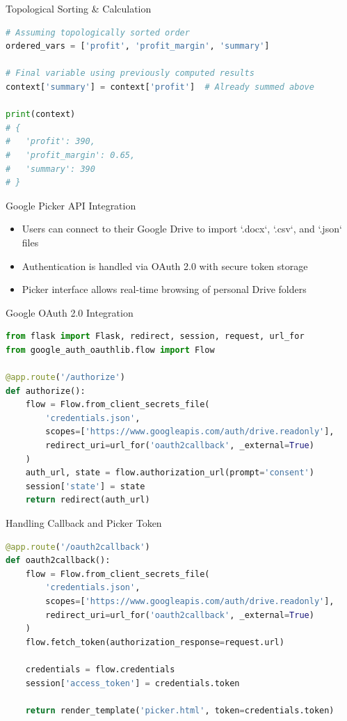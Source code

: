 \documentclass[handout, 12pt]{beamer}
\begin{document}
	\begin{frame}[fragile]{Topological Sorting \& Calculation}
		\begin{lstlisting}[language=Python, breaklines=true, basicstyle=\fontsize{6.5pt}{7.8pt}\selectfont]
# Assuming topologically sorted order
ordered_vars = ['profit', 'profit_margin', 'summary']

# Final variable using previously computed results
context['summary'] = context['profit']  # Already summed above

print(context)
# {
#   'profit': 390,
#   'profit_margin': 0.65,
#   'summary': 390
# }
\end{lstlisting}
	\end{frame}
		
	\begin{frame}{Google Picker API Integration}
		\begin{itemize}
		  \item Users can connect to their Google Drive to import `.docx`, `.csv`, and `.json` files
		  \item Authentication is handled via OAuth 2.0 with secure token storage
		  \item Picker interface allows real-time browsing of personal Drive folders
		\end{itemize}
	\end{frame}

	\begin{frame}[fragile]{Google OAuth 2.0 Integration}
		\begin{lstlisting}[language=Python, breaklines=true, basicstyle=\fontsize{6.5pt}{7.8pt}\selectfont]
from flask import Flask, redirect, session, request, url_for
from google_auth_oauthlib.flow import Flow

@app.route('/authorize')
def authorize():
    flow = Flow.from_client_secrets_file(
        'credentials.json',
        scopes=['https://www.googleapis.com/auth/drive.readonly'],
        redirect_uri=url_for('oauth2callback', _external=True)
    )
    auth_url, state = flow.authorization_url(prompt='consent')
    session['state'] = state
    return redirect(auth_url)
\end{lstlisting}
	\end{frame}

	\begin{frame}[fragile]{Handling Callback and Picker Token}
		\begin{lstlisting}[language=Python, breaklines=true, basicstyle=\fontsize{6.5pt}{7.8pt}\selectfont]
@app.route('/oauth2callback')
def oauth2callback():
    flow = Flow.from_client_secrets_file(
        'credentials.json',
        scopes=['https://www.googleapis.com/auth/drive.readonly'],
        redirect_uri=url_for('oauth2callback', _external=True)
    )
    flow.fetch_token(authorization_response=request.url)

    credentials = flow.credentials
    session['access_token'] = credentials.token

    return render_template('picker.html', token=credentials.token)
\end{lstlisting}
		\end{frame}
		
\end{document}
